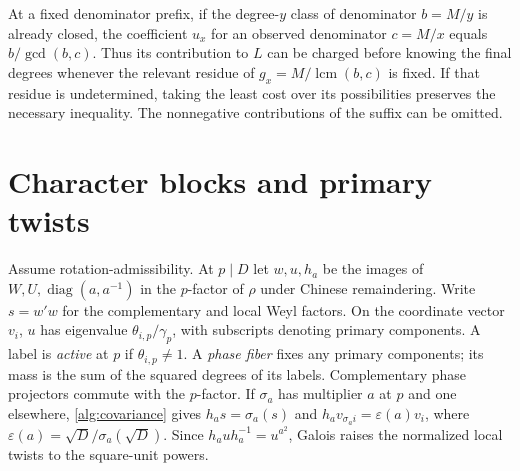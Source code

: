 \documentclass[11pt]{amsart}
\numberwithin{equation}{section}
\theoremstyle{definition}
\theoremstyle{plain}
\DeclareMathOperator{\lcm}{lcm}
\begin{document}
At a fixed denominator prefix, if the degree-$y$ class of denominator
$b=M/y$ is already closed, the coefficient $u_x$ for an observed
denominator $c=M/x$ equals $b/\gcd(b,c)$. Thus its contribution
to $L$ can be charged before knowing the final degrees whenever the
relevant residue of $g_x=M/\lcm(b,c)$ is fixed. If that residue is
undetermined, taking the least cost over its possibilities preserves
the necessary inequality. The nonnegative contributions of the suffix
can be omitted.


\section{Character blocks and primary twists}\label{blk:section}
Assume rotation-admissibility. At $p\mid D$ let $w,u,h_a$ be the
images of $W,U,\operatorname{diag}(a,a^{-1})$ in the $p$-factor
of $\rho$ under Chinese remaindering. Write $s=w'w$ for the
complementary and local Weyl factors. On the coordinate vector $v_i$,
$u$ has eigenvalue $\theta_{i,p}/\gamma_p$, with subscripts denoting
primary components. A label is \emph{active} at $p$ if $\theta_{i,p}\ne1$.
A \emph{phase fiber} fixes any primary components; its mass is the
sum of the squared degrees of its labels. Complementary phase
projectors commute with the $p$-factor. If $\sigma_a$ has multiplier
$a$ at $p$ and one elsewhere, \eqref{alg:covariance} gives
$h_as=\sigma_a(s)$ and $h_av_{\sigma_a i}=\varepsilon(a)v_i$, where
$\varepsilon(a)=\sqrt D/\sigma_a(\sqrt D)$. Since $h_auh_a^{-1}=u^{a^2}$,
Galois raises the normalized local twists to the square-unit powers.
\end{document}
